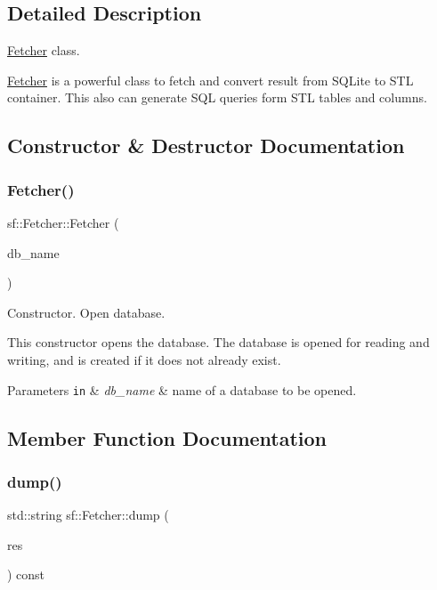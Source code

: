 \subsection{Detailed Description}
\hyperlink{classsf_1_1Fetcher}{Fetcher} class. 

\hyperlink{classsf_1_1Fetcher}{Fetcher} is a powerful class to fetch and convert result from S\+Q\+Lite to S\+TL container. This also can generate S\+QL queries form S\+TL tables and columns. 

\subsection{Constructor \& Destructor Documentation}
\mbox{\label{classsf_1_1Fetcher_a60f501e4abd57b30c206b45290a33661}} 
\subsubsection{\texorpdfstring{Fetcher()}{Fetcher()}}
{\footnotesize\ttfamily sf\+::\+Fetcher\+::\+Fetcher (\begin{DoxyParamCaption}\item[{const std\+::string \&}]{db\+\_\+name }\end{DoxyParamCaption})}



Constructor. Open database. 

This constructor opens the database. The database is opened for reading and writing, and is created if it does not already exist. 
\begin{DoxyParams}[1]{Parameters}
\mbox{\tt in}  & {\em db\+\_\+name} & name of a database to be opened. \\
\hline
\end{DoxyParams}


\subsection{Member Function Documentation}
\mbox{\label{classsf_1_1Fetcher_aaf6a36a51986a9abb72438d9cf747b35}} 
\subsubsection{\texorpdfstring{dump()}{dump()}\hspace{0.1cm}{\footnotesize\ttfamily [1/2]}}
{\footnotesize\ttfamily std\+::string sf\+::\+Fetcher\+::dump (\begin{DoxyParamCaption}\item[{const \hyperlink{structsf_1_1ExecResult__t}{Exec\+Result\+\_\+t} \&}]{res }\end{DoxyParamCaption}) const}



